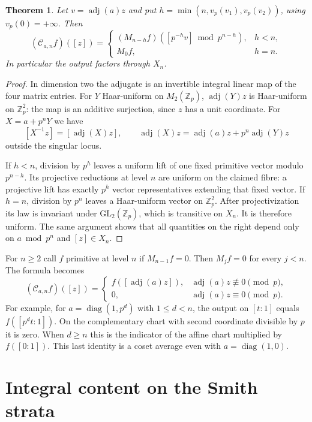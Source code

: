 \documentclass[11pt]{article}
\newtheorem{theorem}{Theorem}
\newcommand{\Zp}{\mathbb Z_p}
\newcommand{\adj}{\operatorname{adj}}
\begin{document}
\begin{theorem}\label{avg}
Let $v=\adj(a)z$ and put $h=\min(n,v_p(v_1),v_p(v_2))$, using
$v_p(0)=+\infty$. Then
\[
 (\mathcal C_{a,n}f)([z])=
 \begin{cases}
 (M_{n-h} f)([p^{-h}v]\bmod p^{n-h}), & h<n,\\
 M_0 f, &h=n .
 \end{cases}
\]
In particular the output factors through $X_n$.
\end{theorem}

\begin{proof}
In dimension two the adjugate is an invertible integral linear map
of the four matrix entries. For $Y$ Haar-uniform on $M_2(\Zp)$,
$\adj(Y)z$ is Haar-uniform on $\Zp^2$: the map is an additive
surjection, since $z$ has a unit coordinate. For $X=a+p^n Y$ we have
\[
 [X^{-1}z]=[\adj(X)z],
 \qquad \adj(X)z=\adj(a)z+p^n\adj(Y)z
\]
outside the singular locus.

If $h<n$, division by $p^h$ leaves a uniform lift of one fixed
primitive vector modulo $p^{n-h}$. Its projective reductions at
level $n$ are uniform on the claimed fibre: a projective lift has
exactly $p^h$ vector representatives extending that fixed vector.
If $h=n$, division by $p^n$ leaves a Haar-uniform vector on
$\Zp^2$. After projectivization its law is invariant under
$\mathrm{GL}_2(\Zp)$, which is transitive on $X_n$.
It is therefore uniform. The same argument shows that all quantities
on the right depend only on $a\bmod p^n$ and $[z]\in X_n$.
\end{proof}

For $n\ge2$ call $f$ primitive at level $n$ if $M_{n-1}f=0$.
Then $M_jf=0$ for every $j<n$. The formula becomes
\begin{equation}\label{adj}
 (\mathcal C_{a,n}f)([z])=
 \begin{cases}
 f([\adj(a)z]),&\adj(a)z\not\equiv0\pmod p,\\
 0,&\adj(a)z\equiv0\pmod p .
 \end{cases}
\end{equation}
For example, for $a=\operatorname{diag}(1,p^d)$ with $1\le d<n$,
the output on $[t:1]$ equals $f([p^dt:1])$. On the complementary
chart with second coordinate divisible by $p$ it is zero. When
$d\ge n$ this is the indicator of the affine chart multiplied by
$f([0:1])$. This last identity is a coset average even with
$a=\operatorname{diag}(1,0)$.

\section{Integral content on the Smith strata}
\end{document}
